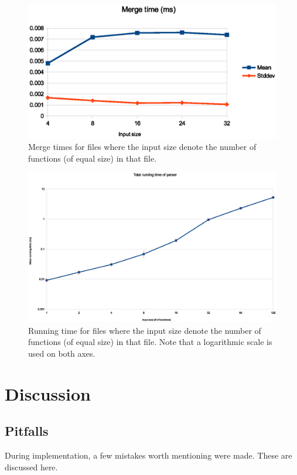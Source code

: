 \documentclass[a4paper,12pt,twosided]{report}
\begin{document}
\begin{figure}[H]
\includegraphics[width=\textwidth]{criterion-merge.eps}
\caption{\label{critmerge}Merge times for files where the input size denote the
number of functions (of equal size) in that file.}
\end{figure}

\begin{figure}[H]
\includegraphics[width=\textwidth]{criterion-1-128.eps}
\caption{\label{criterion}Running time for files where the input size denote the
number of functions (of equal size) in that file. Note that a logarithmic scale
is used on both axes.}
\end{figure}

%
%
\chapter{Discussion}

\section{Pitfalls}
During implementation, a few mistakes worth mentioning were made. These
are discussed here. 
\end{document}
